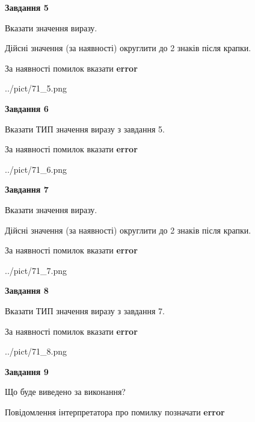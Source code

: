 \documentclass[11pt, ukrainian]{article}
\begin{document}
{\begin {large}
{\begin {center}\textbf{Завдання 5}\end {center}}\par
Вказати значення виразу. \par
Дійсні значення (за наявності) округлити до 2 знаків після крапки. \par
За наявності помилок вказати \textbf{error}

\begin{center}
	{../pict/71_5.png}
\end{center}
\newpage

{\begin {center}\textbf{Завдання 6}\end {center}}\par
Вказати ТИП значення виразу з завдання 5. \par
За наявності помилок вказати \textbf{error}

\begin{center}
	{../pict/71_6.png}
\end{center}
\newpage

{\begin {center}\textbf{Завдання 7}\end {center}}\par
Вказати значення виразу. \par
Дійсні значення (за наявності) округлити до 2 знаків після крапки. \par
За наявності помилок вказати \textbf{error}

\begin{center}
	{../pict/71_7.png}
\end{center}
\newpage

{\begin {center}\textbf{Завдання 8}\end {center}}\par
Вказати ТИП значення виразу з завдання 7. \par
За наявності помилок вказати \textbf{error}

\begin{center}
	{../pict/71_8.png}
\end{center}
\newpage

{\begin {center}\textbf{Завдання 9}\end {center}}\par
Що буде виведено за виконання? \par
Повідомлення інтерпретатора про помилку позначати \textbf{error}


\end{large}}
\end{document}
